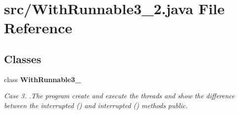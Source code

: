 \section{src/\+With\+Runnable3\+\_\+2.java File Reference}
\label{_with_runnable3__2_8java}
\subsection*{Classes}
\begin{DoxyCompactItemize}
\item 
class {\bf With\+Runnable3\+\_}
\begin{DoxyCompactList}\small\item\em Case 3. .The program create and execute the threads and show the difference between the interrupted () and interrupted () methods  public. \end{DoxyCompactList}\end{DoxyCompactItemize}
